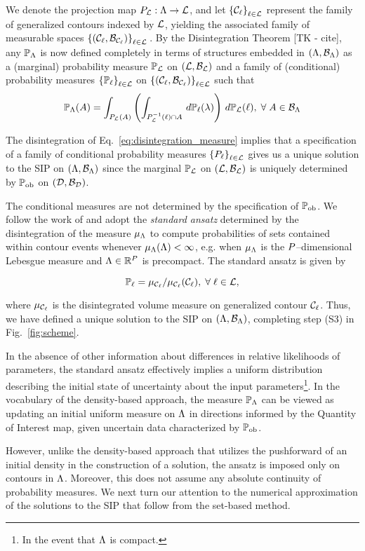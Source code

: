 We denote the projection map $P_{\mathcal{L}} : {\Lambda} \to \mathcal{L}$, and let $\left\{\mathcal{C}_\ell\right\}_{\ell\in\mathcal{L}}$ represent the family of generalized contours indexed by $\mathcal{L}$, yielding the associated family of measurable spaces $\left\{\left ( \mathcal{C}_\ell, \mathcal{B}_{\mathcal{C}_\ell} \right )\right\}_{\ell\in\mathcal{L}}{}$.
By the Disintegration Theorem [TK - cite], any $\mathbb{P}_{\Lambda}$ is now defined completely in terms of structures embedded in $({\Lambda}, \mathcal{B}_{{\Lambda}})$ as a (marginal) probability measure $\mathbb{P}_{\mathcal{L}}$ on $(\mathcal{L}, \mathcal{B}_{\mathcal{L}})$ and a family of (conditional) probability measures $\left\{\mathbb{P}_\ell\right\}_{\ell\in\mathcal{L}}$ on $\left\{\left ( \mathcal{C}_\ell, \mathcal{B}_{\mathcal{C}_\ell} \right )\right\}_{\ell\in\mathcal{L}}$ such that
\begin{equation}\label{eq:disintegration_measure}
\mathbb{P}_{\Lambda} (A) = \int_{P_{\mathcal{L}}(A)} \left ( \int_{P_{\mathcal{L}}^{-1} (\ell) \cap A}\, d\mathbb{P}_\ell(\lambda) \right )\, d\mathbb{P}_{\mathcal{L}} (\ell), \; \forall \; A \in \mathcal{B}_{{\Lambda}}
\end{equation}

The disintegration of Eq.~\eqref{eq:disintegration_measure} implies that a specification of a family of conditional probability measures $\left\{P_\ell\right\}_{\ell\in\mathcal{L}}$ gives us a unique solution to the SIP on ${({\Lambda}, \mathcal{B}_{{\Lambda}})}$ since the marginal $\mathbb{P}_{\mathcal{L}}$ on ${(\mathcal{L}, \mathcal{B}_{\mathcal{L}})}$ is uniquely determined by $\operatorname*{\mathbb{P}_{ob}}$ on ${(\mathcal{D}, \mathcal{B}_{\mathcal{D}})}$.

The conditional measures are not determined by the specification of $\operatorname*{\mathbb{P}_{ob}}$.
We follow the work of \cite{BET+14} and adopt the \emph{standard ansatz} determined by the disintegration of the measure $\mu_{{\Lambda}}$ to compute probabilities of sets contained within contour events whenever $\mu_{{\Lambda}}({\Lambda}) < \infty$, e.g. when $\mu_{{\Lambda}}$ is the $P$--dimensional Lebesgue measure and ${\Lambda} \in \mathbb{R}^P$ is precompact.
The standard ansatz is given by

\begin{equation}\label{eq:standard_ansatz}
\mathbb{P}_\ell = \mu_{\mathcal{C}_\ell} / \mu_{\mathcal{C}_\ell}(\mathcal{C}_\ell), \; \forall \; \ell \in \mathcal{L},
\end{equation}

\noindent where $\mu_{\mathcal{C}_\ell}$ is the disintegrated volume measure on generalized contour $\mathcal{C}_\ell$.
Thus, we have defined a unique solution to the SIP on ${({\Lambda}, \mathcal{B}_{{\Lambda}})}$, completing step (S3) in Fig.~\ref{fig:scheme}.

In the absence of other information about differences in relative likelihoods of parameters, the standard ansatz effectively implies a uniform distribution describing the initial state of uncertainty about the input parameters\footnote{In the event that ${\Lambda}$ is compact.}.
In the vocabulary of the density-based approach, the measure $\mathbb{P}_{\Lambda}$ can be viewed as updating an initial uniform measure on ${\Lambda}$ in directions informed by the Quantity of Interest map, given uncertain data characterized by $\operatorname*{\mathbb{P}_{ob}}$.

However, unlike the density-based approach that utilizes the pushforward of an initial density in the construction of a solution, the ansatz is imposed only on contours in ${\Lambda}$.
Moreover, this does not assume any absolute continuity of probability measures.
We next turn our attention to the numerical approximation of the solutions to the SIP that follow from the set-based method.

\FloatBarrier

